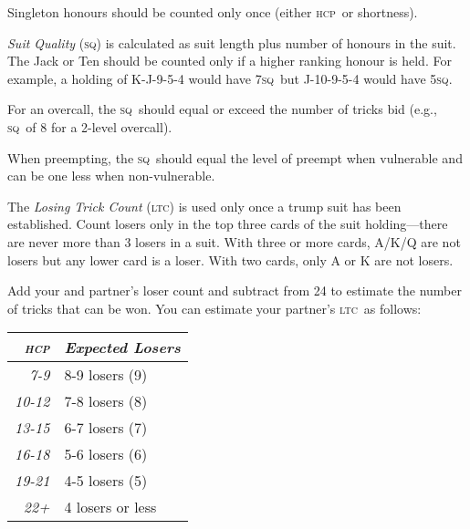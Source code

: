 \documentclass[a4paper,article,oneside]{memoir}
\newcommand{\gap}{\vspace{\baselineskip}}
\newcommand{\hcp}{\textsc{hcp}}
\newcommand{\sq}{\textsc{sq}}
\newcommand{\ltc}{\textsc{ltc}}
\begin{document}
Singleton honours should be counted only once (either \hcp\ or
shortness).

\gap

\emph{Suit Quality} (\sq) is calculated as suit length plus number of
honours in the suit. The Jack or Ten should be counted only if a
higher ranking honour is held. For example, a holding of K-J-9-5-4
would have 7\sq\ but J-10-9-5-4 would have 5\sq.

For an overcall, the \sq\ should equal or exceed the number of tricks
bid (e.g., \sq\ of 8 for a 2-level overcall).

When preempting, the \sq\ should equal the level of preempt when
vulnerable and can be one less when non-vulnerable.

\gap

The \emph{Losing Trick Count} (\ltc) is used only once a trump suit
has been established. Count losers only in the top three cards of the
suit holding---there are never more than 3 losers in a suit. With
three or more cards, A/K/Q are not losers but any lower card is a
loser. With two cards, only A or K are not losers.

Add your and partner's loser count and subtract from 24 to estimate
the number of tricks that can be won.  You can estimate your partner's
\ltc\ as follows:

\begin{tabular}{rp{3cm}}
  \emph{\hcp{}} & \emph{Expected Losers} \\
  \hline
  \emph{7-9} & 8-9 losers (9) \\
  \emph{10-12} & 7-8 losers (8) \\
  \emph{13-15} & 6-7 losers (7) \\
  \emph{16-18} & 5-6 losers (6) \\
  \emph{19-21} & 4-5 losers (5) \\
  \emph{22+} & 4 losers or less \\
  \hline
\end{tabular}
\end{document}
